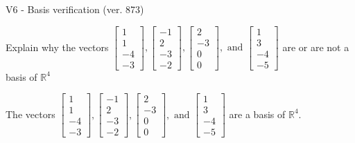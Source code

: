 \begin{exercise}
  \begin{exerciseTitle}V6 - Basis verification (ver. 873)\end{exerciseTitle}
  \begin{exerciseStatement}
    Explain why the vectors \(\left[\begin{array}{r}
1 \\
1 \\
-4 \\
-3
\end{array}\right] , \left[\begin{array}{r}
-1 \\
2 \\
-3 \\
-2
\end{array}\right] , \left[\begin{array}{r}
2 \\
-3 \\
0 \\
0
\end{array}\right] , \text{ and } \left[\begin{array}{r}
1 \\
3 \\
-4 \\
-5
\end{array}\right]\) are or are not a basis of \(\mathbb{R}^4\)	


  \end{exerciseStatement}
  \begin{exerciseAnswer}
   The vectors \(\left[\begin{array}{r}
1 \\
1 \\
-4 \\
-3
\end{array}\right] , \left[\begin{array}{r}
-1 \\
2 \\
-3 \\
-2
\end{array}\right] , \left[\begin{array}{r}
2 \\
-3 \\
0 \\
0
\end{array}\right] , \text{ and } \left[\begin{array}{r}
1 \\
3 \\
-4 \\
-5
\end{array}\right]\) 
  	 are  a basis of \(\mathbb{R}^4\).
  


  \end{exerciseAnswer}
\end{exercise}